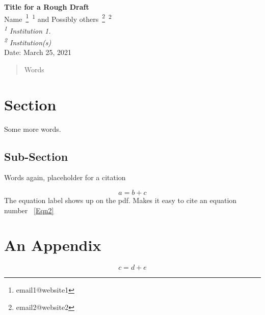 

\SetWatermarkFontSize{15 pt}
\SetWatermarkHorCenter{500 pt}
\SetWatermarkVerCenter{25 pt}



\begin{center}
{\bf Title for a Rough Draft} \bsk\\
    Name~\footnote{email1@website1}~\textsuperscript{1} 
    and Possibly others~\footnote{email2@website2}~\textsuperscript{2}\\
{\em \textsuperscript{1} Institution 1.}\\
{\em \textsuperscript{2} Institution(s)}\\
Date: March 25, 2021
\end{center}

\begin{abstract}
Words
\end{abstract}

\section{Section}
\label{Label1}
\xb
{}
\xa

Some more words. 

\subsection{Sub-Section}
\label{Label2}
\xb
{}
\xa

Words again, placeholder for a citation~\cites{PaperX}

\begin{equation}
    a = b + c
    \label{anEqn}
\end{equation}
%
The equation label shows up on the pdf. Makes it easy to cite an equation number
~\eqref{Eqn2}


\appendix
\section{An Appendix}

\begin{equation}
    c = d + e
    \label{Eqn2}
\end{equation}
%

